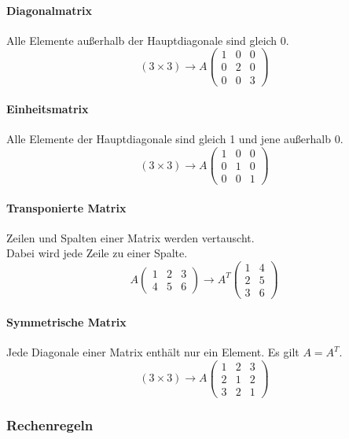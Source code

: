 \documentclass{school}
\begin{document}
\paragraph{Diagonalmatrix}
Alle Elemente außerhalb der Hauptdiagonale sind gleich 0.
$$(3 \times 3) \to A\begin{pmatrix}1 & 0 & 0\\ 0 & 2 & 0\\ 0 & 0 & 3\end{pmatrix}$$

\paragraph{Einheitsmatrix}
Alle Elemente der Hauptdiagonale sind gleich 1 und jene außerhalb 0.
$$(3 \times 3) \to A\begin{pmatrix}1 & 0 & 0\\ 0 & 1 & 0\\ 0 & 0 & 1\end{pmatrix}$$

\paragraph{Transponierte Matrix}
Zeilen und Spalten einer Matrix werden vertauscht.\\
Dabei wird jede Zeile zu einer Spalte.
$$A\begin{pmatrix}1 & 2 & 3\\ 4 & 5 & 6\end{pmatrix} \to A^T\begin{pmatrix}1 & 4\\2 & 5 \\3 & 6\end{pmatrix}$$

\paragraph{Symmetrische Matrix}
Jede Diagonale einer Matrix enthält nur ein Element. Es gilt $A = A^T$.
$$(3 \times 3) \to A\begin{pmatrix}1 & 2 & 3\\ 2 & 1 & 2\\ 3 & 2 & 1\end{pmatrix}$$

\subsubsection{Rechenregeln}
\end{document}

